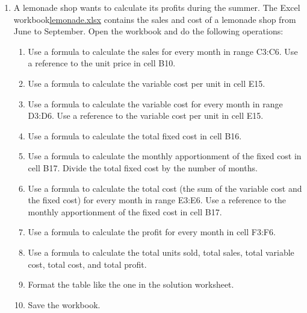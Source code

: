 \begin{enumerate}[leftmargin=*,resume]
\item \label{lemmonade}A lemonade shop wants to calculate its profits during the summer. 
The Excel
workbook\href{http://aprendeconalf.es/office/excel/exercises/formulas/lemonade.xlsx}{\textsf{lemonade.xlsx}} contains
the sales and cost of a lemonade shop from June to September. 
Open the workbook and do the following operations:
\begin{enumerate}
\item Use a formula to calculate the sales for every month in range C3:C6.
Use a reference to the unit price in cell B10. 
\item Use a formula to calculate the variable cost per unit in cell E15. 
\item Use a formula to calculate the variable cost for every month in range D3:D6.
Use a reference to the variable cost per unit in cell E15. 
\item Use a formula to calculate the total fixed cost in cell B16.
\item Use a formula to calculate the monthly apportionment of the fixed cost in cell B17.  
Divide the total fixed cost by the number of months.  
\item Use a formula to calculate the total cost (the sum of the variable cost and the fixed cost) for every month in
range E3:E6.
Use a reference to the monthly apportionment of the fixed cost in cell B17. 
\item Use a formula to calculate the profit for every month in cell F3:F6. 
\item Use a formula to calculate the total units sold, total sales, total variable cost, total cost, and total profit. 
\item Format the table like the one in the solution worksheet. 
\item Save the workbook. 
\end{enumerate}



\end{enumerate}
